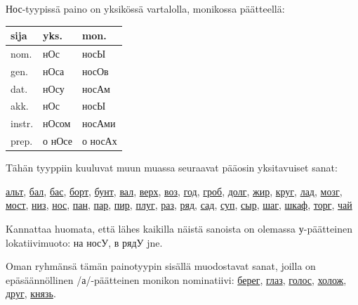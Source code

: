 \documentclass[]{scrartcl}
\begin{document}
Нос-tyypissä paino on yksikössä vartalolla, monikossa päätteellä:

\begin{longtable}[c]{@{}lll@{}}
\toprule
sija & yks. & mon.\tabularnewline
\midrule
\endhead
nom. & нОс & носЫ\tabularnewline
gen. & нОса & носОв\tabularnewline
dat. & нОсу & носАм\tabularnewline
akk. & нОс & носЫ\tabularnewline
instr. & нОсом & носАми\tabularnewline
prep. & о нОсе & о носАх\tabularnewline
\bottomrule
\end{longtable}

Tähän tyyppiin kuuluvat muun muassa seuraavat pääosin yksitavuiset
sanat:

\href{http://ru.wiktionary.org/wiki/альт}{альт},
\href{http://ru.wiktionary.org/wiki/бал}{бал},
\href{http://ru.wiktionary.org/wiki/бас}{бас},
\href{http://ru.wiktionary.org/wiki/борт}{борт},
\href{http://ru.wiktionary.org/wiki/бунт}{бунт},
\href{http://ru.wiktionary.org/wiki/вал}{вал},
\href{http://ru.wiktionary.org/wiki/верх}{верх},
\href{http://ru.wiktionary.org/wiki/воз}{воз},
\href{http://ru.wiktionary.org/wiki/год}{год},
\href{http://ru.wiktionary.org/wiki/гроб}{гроб},
\href{http://ru.wiktionary.org/wiki/долг}{долг},
\href{http://ru.wiktionary.org/wiki/жир}{жир},
\href{http://ru.wiktionary.org/wiki/круг}{круг},
\href{http://ru.wiktionary.org/wiki/лад}{лад},
\href{http://ru.wiktionary.org/wiki/мозг}{мозг},
\href{http://ru.wiktionary.org/wiki/мост}{мост},
\href{http://ru.wiktionary.org/wiki/низ}{низ},
\href{http://ru.wiktionary.org/wiki/нос}{нос},
\href{http://ru.wiktionary.org/wiki/пан}{пан},
\href{http://ru.wiktionary.org/wiki/пар}{пар},
\href{http://ru.wiktionary.org/wiki/пир}{пир},
\href{http://ru.wiktionary.org/wiki/плуг}{плуг},
\href{http://ru.wiktionary.org/wiki/раз}{раз},
\href{http://ru.wiktionary.org/wiki/ряд}{ряд},
\href{http://ru.wiktionary.org/wiki/сад}{сад},
\href{http://ru.wiktionary.org/wiki/суп}{суп},
\href{http://ru.wiktionary.org/wiki/сыр}{сыр},
\href{http://ru.wiktionary.org/wiki/шаг}{шаг},
\href{http://ru.wiktionary.org/wiki/шкаф}{шкаф},
\href{http://ru.wiktionary.org/wiki/торг}{торг},
\href{http://ru.wiktionary.org/wiki/чай}{чай}

Kannattaa huomata, että lähes kaikilla näistä sanoista on olemassa
у-päätteinen lokatiivimuoto: на носУ, в рядУ jne.

Oman ryhmänsä tämän painotyypin sisällä muodostavat sanat, joilla on
epäsäännöllinen /а/-päätteinen monikon nominatiivi:
\href{http://ru.wiktionary.org/wiki/берег}{берег},
\href{http://ru.wiktionary.org/wiki/глаз}{глаз},
\href{http://ru.wiktionary.org/wiki/голос}{голос},
\href{http://ru.wiktionary.org/wiki/холож}{холож},
\href{http://ru.wiktionary.org/wiki/друг}{друг},
\href{http://ru.wiktionary.org/wiki/князь}{князь}.
\end{document}
